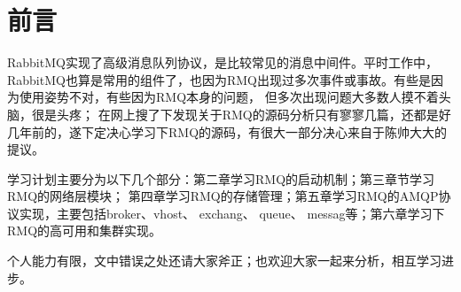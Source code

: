 \chapter{前言}

RabbitMQ实现了高级消息队列协议，是比较常见的消息中间件。平时工作中，RabbitMQ也算是常用的组件了，也因为RMQ出现过多次事件或事故。有些是因为使用姿势不对，有些因为RMQ本身的问题， 但多次出现问题大多数人摸不着头脑，很是头疼； 在网上搜了下发现关于RMQ的源码分析只有寥寥几篇，还都是好几年前的，遂下定决心学习下RMQ的源码，有很大一部分决心来自于陈帅大大的提议。

学习计划主要分为以下几个部分：第二章学习RMQ的启动机制；第三章节学习RMQ的网络层模块； 第四章学习RMQ的存储管理；第五章学习RMQ的AMQP协议实现，主要包括broker、vhost、 exchang、 queue、 messag等；第六章学习下RMQ的高可用和集群实现。

个人能力有限，文中错误之处还请大家斧正；也欢迎大家一起来分析，相互学习进步。